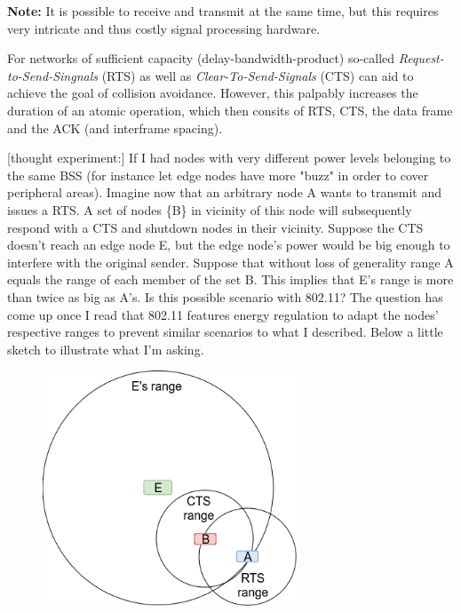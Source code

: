 \documentclass{article}
\begin{document}
	\medskip
	
	\textbf{Note:} It is possible to receive and transmit at the same time, but this requires very intricate and thus costly signal processing hardware. 
	
	\bigskip
	
	For networks of sufficient capacity (delay-bandwidth-product) so-called \emph{Request-to-Send-Singnals} (RTS) as well as \emph{Clear-To-Send-Signals} (CTS) can aid to achieve the goal of collision avoidance. However, this palpably increases the duration of an atomic operation, which then consits of RTS, CTS, the data frame and the ACK (and interframe spacing).
	
	\bigskip
	
	\color{blue}
	[thought experiment:] If I had nodes with very different power levels belonging to the same BSS (for instance let edge nodes have more "buzz" in order to cover peripheral areas). Imagine now that an arbitrary node A wants to transmit and issues a RTS. A set of nodes \{B\} in vicinity of this node will subsequently respond with a CTS and shutdown nodes in their vicinity. Suppose the CTS doesn't reach an edge node E, but the edge node's power would be big enough to interfere with the original sender. Suppose that without loss of generality range A equals the range of each member of the set {B}. This implies that E's range is more than twice as big as A's. Is this possible scenario with 802.11? The question has come up once I read that 802.11 features energy regulation to adapt the nodes' respective ranges to prevent similar scenarios to what I described. Below a little sketch to illustrate what I'm asking.
	\color{black}

	\begin{figure}[h] \label{signal-ranges}
		\includegraphics[height=7cm, keepaspectratio]{signal-ranges}
		\centering
	\end{figure}
	
\end{document}
